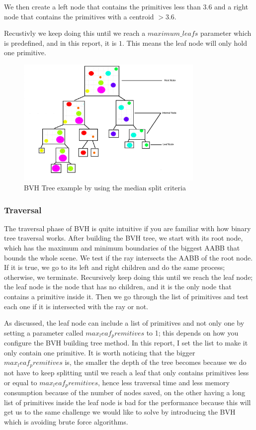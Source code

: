\documentclass[11pt,a4paper]{article}
\begin{document}
We then create a left node that contains the primitives less than 3.6 and a right node that contains the primitives with a centroid $ > 3.6$. 

Recustivly we keep doing this until we reach a $maximum\_leafs$ parameter which is predefined, and in this report, it is $1$. This means the leaf node will only hold one primitive. 


\begin{figure}[h]	
     \centering
         \includegraphics[width=9cm]{images/example_bvh/tree.png}
        \caption{BVH Tree example by using the median split criteria}
        \label{fig:dice}
\end{figure}
\clearpage


\subsubsection{Traversal}
 The traversal phase of BVH is quite intuitive if you are familiar with how binary tree traversal works. After building the BVH tree, we start with its root node, which has the maximum and minimum boundaries of the biggest AABB that bounds the whole scene. We test if the ray intersects the AABB of the root node. If it is true, we go to its left and right children and do the same process; otherwise, we terminate. Recursively keep doing this until we reach the leaf node; the leaf node is the node that has no children, and it is the only node that contains a primitive inside it. Then we go through the list of primitives and test each one if it is intersected with the ray or not. 

As discussed, the leaf node can include a list of primitives and not only one by setting a parameter called $max_leaf_premitives$ to 1; this depends on how you configure the BVH building tree method. In this report, I set the list to make it only contain one primitive. It is worth noticing that the bigger $max_leaf_premitives$ is, the smaller the depth of the tree becomes because we do not have to keep splitting until we reach a leaf that only contains primitives less or equal to $max_leaf_premitives$, hence less traversal time and less memory consumption because of the number of nodes saved, on the other having a long list of primitives inside the leaf node is bad for the performance because this will get us to the same challenge we would like to solve by introducing the BVH which is avoiding brute force algorithms.
\end{document}
